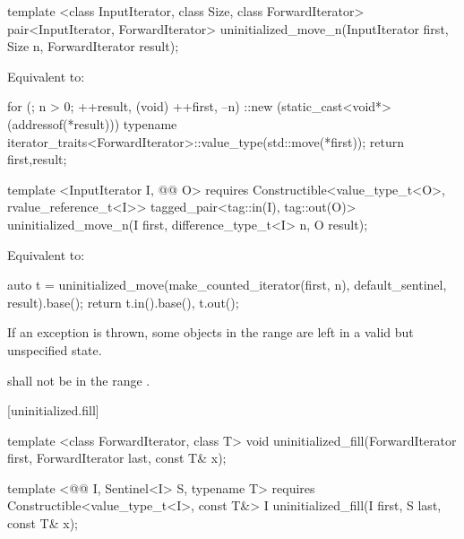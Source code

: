 {\color{remclr}
\begin{codeblock}
template <class InputIterator, class Size, class ForwardIterator>
  pair<InputIterator, ForwardIterator>
    uninitialized_move_n(InputIterator first, Size n, ForwardIterator result);
\end{codeblock}

\setcounter{Paras}{2}
\pnum
\effects Equivalent to:
\begin{codeblock}
        for (; n > 0; ++result, (void) ++first, --n)
          ::new (static_cast<void*>(addressof(*result)))
            typename iterator_traits<ForwardIterator>::value_type(std::move(*first));
        return {first,result};
\end{codeblock}
} %

{\color{addclr}
\begin{codeblock}
template <InputIterator I, @@ O>
requires
  Constructible<value_type_t<O>, rvalue_reference_t<I>>
tagged_pair<tag::in(I), tag::out(O)>
  uninitialized_move_n(I first, difference_type_t<I> n, O result);
\end{codeblock}

\pnum
\effects Equivalent to:
\begin{codeblock}
    auto t = uninitialized_move(make_counted_iterator(first, n),
                                default_sentinel{}, result).base();
    return {t.in().base(), t.out()};
\end{codeblock}
} %

\setcounter{Paras}{3}
\pnum
\remarks If an exception is thrown, some objects in the range 
are left in a valid\added{,} but unspecified state.

{\color{addclr}
\setcounter{Paras}{5}
\pnum
\requires {} shall not be in the range .
} %

[uninitialized.fill]{}
{\color{remclr}
\begin{codeblock}
template <class ForwardIterator, class T>
  void uninitialized_fill(ForwardIterator first, ForwardIterator last,
                          const T& x);
\end{codeblock}
} %

{\color{addclr}
\begin{codeblock}
template <@@ I, Sentinel<I> S, typename T>
requires
  Constructible<value_type_t<I>, const T&>
I uninitialized_fill(I first, S last, const T& x);
\end{codeblock}
} %

